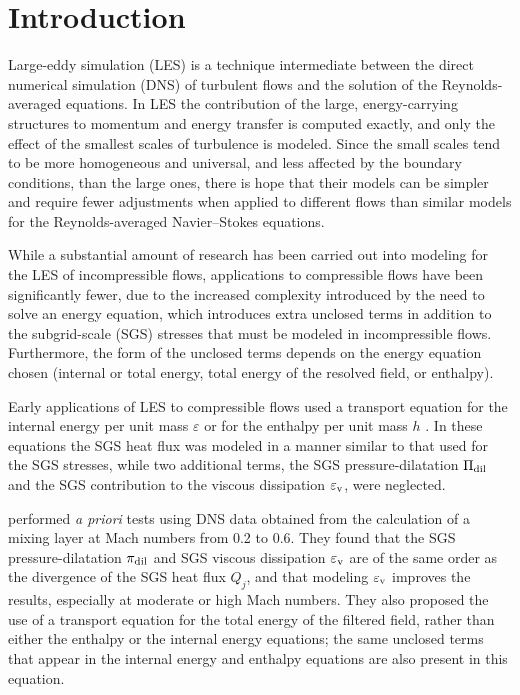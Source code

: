 \documentclass[tcfd]{svjour}
\begin{document}
\maketitle


\section{Introduction}
\label{sec:1}

Large-eddy simulation (LES) is a technique intermediate between the
direct numerical simulation (DNS) of turbulent f\/lows and the solution of the
Reynolds-averaged equations. In LES the contribution of the large,
energy-carrying structures to momentum and energy transfer is computed
exactly, and only the effect of the smallest scales of turbulence is
modeled. Since the small scales tend to be more homogeneous and
universal, and less affected by the boundary conditions, than the
large ones, there is hope that their models can be simpler and require
fewer adjustments when applied to different f\/lows than similar models
for the Reynolds-averaged Navier--Stokes equations.

While a substantial amount of research has been carried out into
modeling for the LES of incompressible f\/lows, applications to
compressible f\/lows have been signif\/icantly fewer, due to the increased
complexity introduced by the need to solve an energy equation, which
introduces extra unclosed terms in addition to the subgrid-scale (SGS)
stresses that must be modeled in incompressible f\/lows. Furthermore,
the form of the unclosed terms depends on the energy equation chosen
(internal or total energy, total energy of the resolved f\/ield, or
enthalpy).

Early applications of LES to compressible f\/lows used a transport
equation for the internal energy per unit mass $\varepsilon$
\citep{moi91,elh94} or for the enthalpy per unit mass $h$
\citep{spe88,erl92}. In these equations the SGS heat f\/lux was modeled
in a manner similar to that used for the SGS stresses, while two
additional terms, the SGS pressure-dilatation $\Pi_{\rm dil}$ and the
SGS contribution to the viscous dissipation $\varepsilon_{\rm v}$, were
neglected.

\citet[b]{vre95a} performed {\it a priori} tests using DNS data obtained
from the calculation of a mixing layer at Mach numbers from 0.2 to 0.6.
They found that the SGS pressure-dilatation $\pi_{\rm dil}$ and SGS
viscous dissipation $\varepsilon_{\rm v}$ are of the same order as the
divergence of the SGS heat f\/lux $Q_j$, and that modeling
$\varepsilon_{\rm v}$ improves the results, especially at moderate or
high Mach numbers. They also proposed the use of a transport equation
for the total energy of the f\/iltered f\/ield, rather than either the
enthalpy or the internal energy equations; the same unclosed terms that
appear in the internal energy and enthalpy equations are also present in
this equation.
\end{document}

